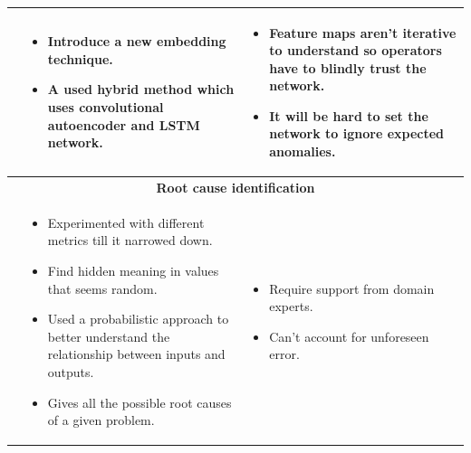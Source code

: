 \begin{longtable}{| p{25mm} | p{62mm} | p{62mm} |}
    \cite{zhang2019deep} &
    \vspace{-8mm}
    \begin{itemize}[leftmargin=3mm,noitemsep,nolistsep] 
        \item Introduce a new embedding technique.
        \item A used hybrid method which uses convolutional autoencoder and LSTM network.
        \vspace{-7mm}
    \end{itemize} &
    \vspace{-8mm}
    \begin{itemize}[leftmargin=3mm,noitemsep,nolistsep] 
        \item Feature maps aren't iterative to understand so operators have to blindly trust the network.
        \item It will be hard to set the network to ignore expected anomalies.
        \vspace{-7mm}
    \end{itemize} \\ \hline
    
    
    \multicolumn{3}{|c|}{\textbf{Root cause identification}} \\ \hline
        
    \cite{chigurupati2017root} &
    \vspace{-8mm}
    \begin{itemize}[leftmargin=3mm,noitemsep,nolistsep] 
        \item Experimented with different metrics till it narrowed down.
        \item Find hidden meaning in values that seems random.
        \item Used a probabilistic approach to better understand the relationship between inputs and outputs.
        \item Gives all the possible root causes of a given problem.
        \vspace{-7mm}
    \end{itemize} &
    \vspace{-8mm}
    \begin{itemize}[leftmargin=3mm,noitemsep,nolistsep] 
        \item Require support from domain experts.
        \item Can't account for unforeseen error.
        \vspace{-7mm}
    \end{itemize} \\ \hline
    

\end{longtable}
